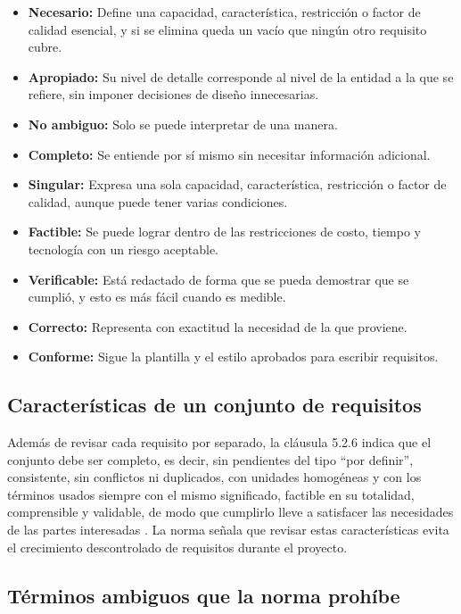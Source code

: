 \documentclass[conference,onecolumn]{IEEEtran}
\begin{document}
\begin{itemize}
\item \textbf{Necesario:} Define una capacidad, característica, restricción o factor de calidad esencial, y si se elimina queda un vacío que ningún otro requisito cubre.
\item \textbf{Apropiado:} Su nivel de detalle corresponde al nivel de la entidad a la que se refiere, sin imponer decisiones de diseño innecesarias.
\item \textbf{No ambiguo:} Solo se puede interpretar de una manera.
\item \textbf{Completo:} Se entiende por sí mismo sin necesitar información adicional.
\item \textbf{Singular:} Expresa una sola capacidad, característica, restricción o factor de calidad, aunque puede tener varias condiciones.
\item \textbf{Factible:} Se puede lograr dentro de las restricciones de costo, tiempo y tecnología con un riesgo aceptable.
\item \textbf{Verificable:} Está redactado de forma que se pueda demostrar que se cumplió, y esto es más fácil cuando es medible.
\item \textbf{Correcto:} Representa con exactitud la necesidad de la que proviene.
\item \textbf{Conforme:} Sigue la plantilla y el estilo aprobados para escribir requisitos.
\end{itemize}

\subsection{Características de un conjunto de requisitos}

Además de revisar cada requisito por separado, la cláusula 5.2.6 indica que el conjunto debe ser completo, es decir, sin pendientes del tipo “por definir”, consistente, sin conflictos ni duplicados, con unidades homogéneas y con los términos usados siempre con el mismo significado, factible en su totalidad, comprensible y validable, de modo que cumplirlo lleve a satisfacer las necesidades de las partes interesadas \cite[\nopp cl.~5.2.6]{ieee29148}. La norma señala que revisar estas características evita el crecimiento descontrolado de requisitos durante el proyecto.

\subsection{Términos ambiguos que la norma prohíbe}
\end{document}
